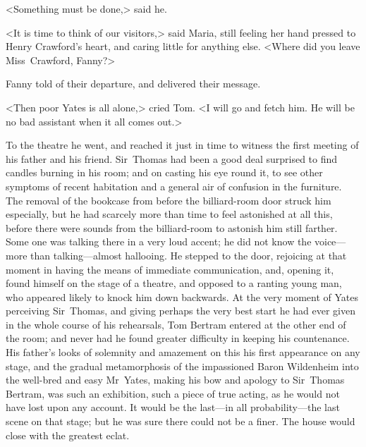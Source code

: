 <Something must be done,> said he.

<It is time to think of our visitors,> said Maria, still feeling her hand pressed to Henry Crawford's heart, and caring little for anything else. <Where did you leave Miss~Crawford, Fanny?>

Fanny told of their departure, and delivered their message.

<Then poor Yates is all alone,> cried Tom. <I will go and fetch him. He will be no bad assistant when it all comes out.>

To the theatre he went, and reached it just in time to witness the first meeting of his father and his friend. Sir~Thomas had been a good deal surprised to find candles burning in his room; and on casting his eye round it, to see other symptoms of recent habitation and a general air of confusion in the furniture. The removal of the bookcase from before the billiard-room door struck him especially, but he had scarcely more than time to feel astonished at all this, before there were sounds from the billiard-room to astonish him still farther. Some one was talking there in a very loud accent; he did not know the voice—more than talking—almost hallooing. He stepped to the door, rejoicing at that moment in having the means of immediate communication, and, opening it, found himself on the stage of a theatre, and opposed to a ranting young man, who appeared likely to knock him down backwards. At the very moment of Yates perceiving Sir~Thomas, and giving perhaps the very best start he had ever given in the whole course of his rehearsals, Tom Bertram entered at the other end of the room; and never had he found greater difficulty in keeping his countenance. His father's looks of solemnity and amazement on this his first appearance on any stage, and the gradual metamorphosis of the impassioned Baron Wildenheim into the well-bred and easy Mr~Yates, making his bow and apology to Sir~Thomas Bertram, was such an exhibition, such a piece of true acting, as he would not have lost upon any account. It would be the last—in all probability—the last scene on that stage; but he was sure there could not be a finer. The house would close with the greatest eclat.

